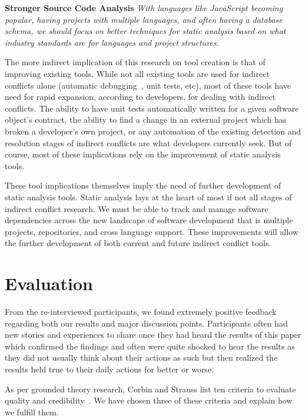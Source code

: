 \documentclass[conference]{IEEEtran}
\begin{document}
\textbf{Stronger Source Code Analysis} \textit{With languages like JavaScript becoming popular, having projects with
multiple languages, and often having a database schema, we should focus on better techniques for static analysis based
on what industry standards are for languages and project structures.}

The more indirect implication of this research on tool creation is that of improving existing tools. While not all existing
tools are used for indirect conflicts alone (automatic debugging~\cite{Zeller:2005:WPF}, unit tests, etc), most of these tools
have need for rapid expansion, according to developers, for dealing with indirect conflicts. The ability to have unit tests
automatically written for a given software object's contract, the ability to find a change  in an external project
which has broken a developer's own project, or any automation of the existing detection and resolution stages of indirect
conflicts are what developers currently seek. But of course, most of these implications rely on the improvement of 
static analysis tools.

These tool implications themselves imply the need of further development of static analysis tools. Static 
analysis lays at the heart of most if not all stages of indirect conflict research. We must be able to track and manage
software dependencies across the new landscape of software development that is multiple projects, repositories, and cross
language support. These improvements will allow the further development of both current and future indirect conflict
tools.

\section{Evaluation}
\label{sec:eval}

From the re-interviewed participants, we found extremely positive feedback regarding both our results and major discussion
points. Participants often had new stories and experiences to share once they had heard the results of this paper which
confirmed the findings and often were quite shocked to hear the results as they did not usually think about their actions
as such but then realized the results held true to their daily actions for better or worse.

As per grounded theory research, Corbin and Strauss list ten criteria to evaluate quality and credibility~\cite{Corbin:1998:SP}.
We have chosen three of these criteria and explain how we fulfill them.
\end{document}

